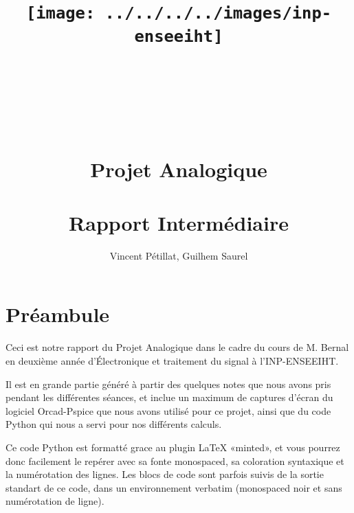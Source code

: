 \documentclass{article}
\title{\texttt{[image: ../../../../images/inp-enseeiht]} \\ ~ \\ ~ \\ ~ \\ ~ \\ Projet Analogique \\ ~ \\ Rapport Intermédiaire}
\author{Vincent Pétillat, Guilhem Saurel}
\date{\oldstylenums{\today}}
\begin{document}
\begin{titlepage}
    \setcounter{page}{0}
    \maketitle
    \thispagestyle{empty}
\end{titlepage}

\tableofcontents

\section*{Préambule}

Ceci est notre rapport du Projet Analogique dans le cadre du cours de M. Bernal
en deuxième année d’Électronique et traitement du signal à l’INP-ENSEEIHT.

Il est en grande partie généré à partir des quelques notes que nous avons pris
pendant les différentes séances, et inclue un maximum de captures d’écran du logiciel
Orcad-Pspice que nous avons utilisé pour ce projet, ainsi que du code Python
qui nous a servi pour nos différents calculs.

Ce code Python est formatté grace au plugin LaTeX «minted», et vous pourrez donc
facilement le repérer avec sa fonte monospaced, sa coloration syntaxique et
la numérotation des lignes. Les blocs de code sont parfois suivis de la sortie
standart de ce code, dans un environnement verbatim (monospaced noir et sans numérotation de ligne).


\end{document}
